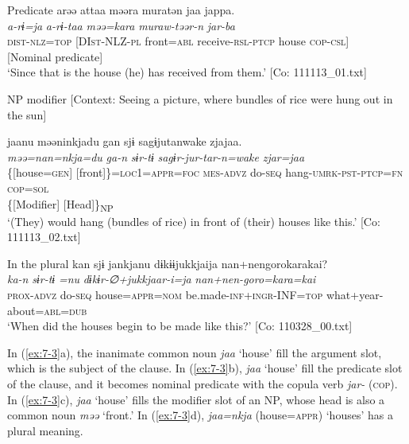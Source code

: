 \ex \label{ex:7:3b}Predicate
{\TM}
\gllll  arəə  attaa  məəra  muratən  jaa  jappa.\\
\textit{a-rɨ=ja}  \textit{a-rɨ-taa}  \textit{məə=kara}  \textit{muraw-təər-n}  \textit{}  \textit{jar-ba}\\
\textsc{dist}-\textsc{nlz}=\textsc{top}  [DI\textsc{st}-NLZ-\textsc{pl}  front=\textsc{abl}  receive-\textsc{rsl}-\textsc{ptcp}  house                               \textsc{cop}-\textsc{csl}]\\
{}[Nominal predicate]\\
\glt ‘Since that is the house (he) has received from them.’ [Co: 111113\_01.txt]

\ex \label{ex:7:3c}NP modifier
    [Context: Seeing a picture, where bundles of rice were hung out in the sun]

{\TM}
\gllll jaanu  məəninkjadu  gan  sjɨ   sagɨjutanwake  zjajaa.\\
\textit{}  \textit{məə=nan=nkja=du}  \textit{ga-n}  \textit{sɨr-tɨ} \textit{sagɨr-jur-tar-n=wake}  \textit{zjar=jaa}\\
      \{[house=\textsc{gen}]  [front]\}=\textsc{loc}1=\textsc{appr}=\textsc{foc}  \textsc{mes}-\textsc{advz}  do-\textsc{seq}                  hang-\textsc{umrk}-\textsc{pst}-\textsc{ptcp}=\textsc{fn}  \textsc{cop}=\textsc{sol}\\
      \{[Modifier]  [Head]\}\textsubscript{NP}    \\
\glt    ‘(They) would hang (bundles of rice) in front of (their) houses like this.’       [Co: 111113\_02.txt]

\ex \label{ex:7:3d}In the plural
{\TM}
\glll  kan  sjɨ  jankjanu  dɨkɨɨjukkjaija {\textbar}nan+nengoro{\textbar}karakai?\\
\textit{ka-n}  \textit{sɨr-tɨ}  \textit{=nu}  \textit{dɨkɨr-∅+jukkjaar-i=ja}  \textit{nan+nen-goro=kara=kai}\\
\textsc{prox}-\textsc{advz}  do-\textsc{seq}  house=\textsc{appr}=\textsc{nom}  be.made-\textsc{inf}+\textsc{ingr}-INF=\textsc{top}  what+year-about=\textsc{abl}=\textsc{dub}\\
\glt ‘When did the houses begin to be made like this?’ [Co: 110328\_00.txt]

\z
\z

In (\ref{ex:7-3}a), the inanimate common noun \textit{jaa} ‘house’ fill the argument slot, which is the subject of the clause. In (\ref{ex:7-3}b), \textit{jaa} ‘house’ fill the predicate slot of the clause, and it becomes nominal predicate with the copula verb \textit{jar-} (\textsc{cop}). In (\ref{ex:7-3}c), \textit{jaa} ‘house’ fills the modifier slot of an NP, whose head is also a common noun \textit{məə} ‘front.’ In (\ref{ex:7-3}d), \textit{jaa=nkja} (house=\textsc{appr}) ‘houses’ has a plural meaning.

